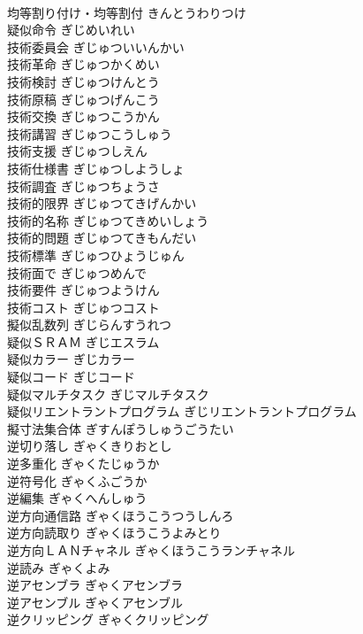 \documentclass[8pt]{extreport}
\begin{document}
\begin{CJK}{UTF8}{min}
\\	均等割り付け・均等割付	きんとうわりつけ	
\\	疑似命令	ぎじめいれい	
\\	技術委員会	ぎじゅついいんかい	
\\	技術革命	ぎじゅつかくめい	
\\	技術検討	ぎじゅつけんとう	
\\	技術原稿	ぎじゅつげんこう	
\\	技術交換	ぎじゅつこうかん	
\\	技術講習	ぎじゅつこうしゅう	
\\	技術支援	ぎじゅつしえん	
\\	技術仕様書	ぎじゅつしようしょ	
\\	技術調査	ぎじゅつちょうさ	
\\	技術的限界	ぎじゅつてきげんかい	
\\	技術的名称	ぎじゅつてきめいしょう	
\\	技術的問題	ぎじゅつてきもんだい	
\\	技術標準	ぎじゅつひょうじゅん	
\\	技術面で	ぎじゅつめんで	
\\	技術要件	ぎじゅつようけん	
\\	技術コスト	ぎじゅつコスト	
\\	擬似乱数列	ぎじらんすうれつ	
\\	疑似ＳＲＡＭ	ぎじエスラム	
\\	疑似カラー	ぎじカラー	
\\	疑似コード	ぎじコード	
\\	疑似マルチタスク	ぎじマルチタスク	
\\	疑似リエントラントプログラム	ぎじリエントラントプログラム	
\\	擬寸法集合体	ぎすんぽうしゅうごうたい	
\\	逆切り落し	ぎゃくきりおとし	
\\	逆多重化	ぎゃくたじゅうか	
\\	逆符号化	ぎゃくふごうか	
\\	逆編集	ぎゃくへんしゅう	
\\	逆方向通信路	ぎゃくほうこうつうしんろ	
\\	逆方向読取り	ぎゃくほうこうよみとり	
\\	逆方向ＬＡＮチャネル	ぎゃくほうこうランチャネル	
\\	逆読み	ぎゃくよみ	
\\	逆アセンブラ	ぎゃくアセンブラ	
\\	逆アセンブル	ぎゃくアセンブル	
\\	逆クリッピング	ぎゃくクリッピング	

\end{CJK}
\end{document}
